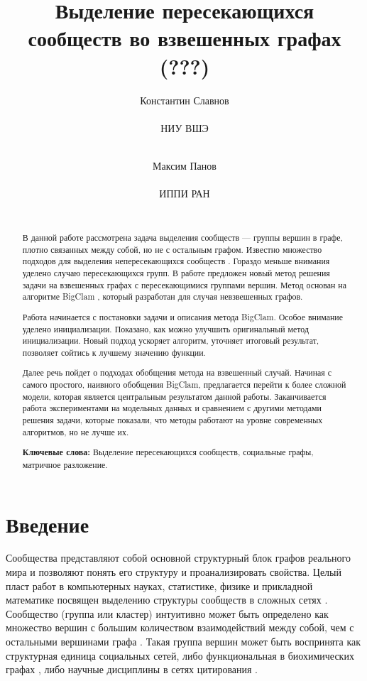 \documentclass{ITaSconf}
\title{Выделение пересекающихся сообществ во взвешенных графах (???)\\\note{ЧЕРНОВИК}}
\author{
  Константин Славнов \\
  \begin{affiliation}
    НИУ ВШЭ
  \end{affiliation}\\
  \email{kaslavnov@edu.hse.ru}
  \and
  Максим Панов \\
  \begin{affiliation}
    ИППИ РАН
  \end{affiliation}\\
  \email{???@???.edu}
}
\begin{document}
\maketitle
\begin{abstract}
	В данной работе рассмотрена задача выделения сообществ --- группы вершин в графе, плотно связанных между собой, но не с остальным графом. Известно множество подходов для выделения непересекающихся сообществ \cite{Fortunato10}. Гораздо меньше внимания уделено случаю пересекающихся групп. В работе предложен новый метод решения задачи на взвешенных графах с пересекающимися группами вершин. Метод основан на алгоритме BigClam \cite{yang2013overlapping}, который разработан для случая невзвешенных графов.
	
	Работа начинается с постановки задачи и описания метода BigClam. Особое внимание уделено инициализации. Показано, как можно улучшить оригинальный метод инициализации. Новый подход ускоряет алгоритм, уточняет итоговый результат, позволяет сойтись к лучшему значению функции.
	
	Далее речь пойдет о подходах обобщения метода на взвешенный случай. 
	Начиная с самого простого, наивного обобщения BigClam, предлагается перейти к более сложной модели, которая является центральным результатом данной работы.
	Заканчивается работа экспериментами на модельных данных и сравнением с другими методами решения задачи, которые показали, что методы работают на уровне современных алгоритмов, но не лучше их.
	
	\textbf{Ключевые слова:} Выделение пересекающихся сообществ, социальные графы, матричное разложение.
\end{abstract}

\section{Введение}

Сообщества представляют собой основной структурный блок графов реального мира и позволяют понять его структуру и проанализировать свойства.
Целый пласт работ в компьютерных науках, статистике, физике и прикладной математике посвящен выделению структуры сообществ в сложных сетях \cite{Fortunato10}. Сообщество (группа или кластер) интуитивно может быть определено как множество вершин с большим количеством взаимодействий между собой, чем с остальными вершинами графа \cite{girvan2002community}. Такая группа вершин может быть воспринята как структурная единица социальных сетей, либо функциональная в биохимических графах \cite{krogan2006global}, либо научные дисциплины в сетях цитирования \cite{backstrom2006group}. 
\end{document}
